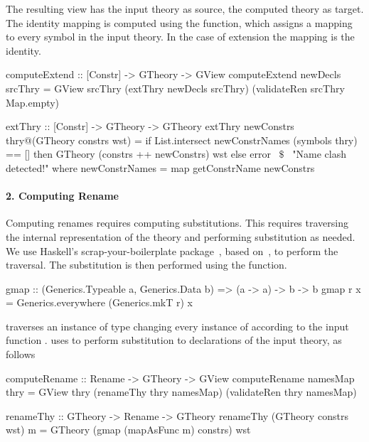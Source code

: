 The resulting view has the input theory as source, the computed theory as target. The identity mapping is computed using the  function, which assigns a mapping to every symbol in the input theory. In the case of extension the mapping is the identity. 
\begin{hscode}
computeExtend :: [Constr] -> GTheory -> GView
computeExtend newDecls srcThry =
  GView srcThry (extThry newDecls srcThry) (validateRen srcThry Map.empty)

extThry :: [Constr] -> GTheory -> GTheory 
extThry newConstrs thry@(GTheory constrs wst) =
  if List.intersect newConstrNames (symbols thry) == []
  then GTheory (constrs ++ newConstrs) wst
  else error ~$\$$~ "Name clash detected!"
    where newConstrNames = map getConstrName newConstrs
\end{hscode}

\paragraph{2. Computing Rename}
Computing renames requires computing substitutions. This requires traversing the internal representation of the theory and performing substitution as needed. We use Haskell's scrap-your-boilerplate package~\cite{syb}, based on~\cite{syb2003Jones}, to perform the traversal. The substitution is then performed using the  function. 
\begin{hscode} 
gmap :: (Generics.Typeable a, Generics.Data b) => (a -> a) -> b -> b
gmap r x = Generics.everywhere (Generics.mkT r) x  
\end{hscode} 
 traverses an instance of type  changing every instance of  according to the input function .  uses  to perform substitution to declarations of the input theory, as follows
\begin{hscode}
computeRename :: Rename -> GTheory -> GView  
computeRename namesMap thry =
  GView thry (renameThy thry namesMap) (validateRen thry namesMap)

renameThy :: GTheory -> Rename -> GTheory
renameThy (GTheory constrs wst) m =
  GTheory (gmap (mapAsFunc m) constrs) wst
\end{hscode}

